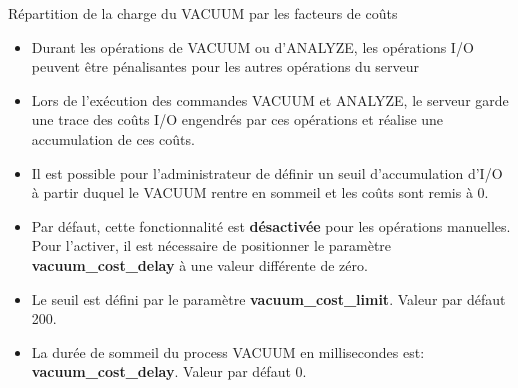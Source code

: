 
\begin{frame}{Répartition de la charge du VACUUM par les facteurs de coûts}

\begin{itemize}
   \item Durant les opérations de VACUUM ou d'ANALYZE, les opérations I/O peuvent être pénalisantes pour les autres opérations du serveur
   \item Lors de l'exécution des commandes VACUUM et ANALYZE, le serveur garde une trace des coûts I/O engendrés par ces opérations et réalise une accumulation de ces coûts.
   \item Il est possible pour l'administrateur de définir un seuil d'accumulation d'I/O à partir duquel le VACUUM rentre en sommeil et les coûts sont remis à 0.
   \item Par défaut, cette fonctionnalité est \textbf{désactivée} pour les opérations manuelles. Pour l'activer, il est nécessaire de positionner le paramètre \textbf{vacuum\_cost\_delay} à une valeur différente de zéro.
   \item Le seuil est défini par le paramètre \textbf{vacuum\_cost\_limit}. Valeur par défaut 200.
   \item La durée de sommeil du process VACUUM en millisecondes est: \textbf{vacuum\_cost\_delay}. Valeur par défaut 0.

\end{itemize}

\begin{tiny}
\begin{toile}
\end{toile}
\end{tiny}

\end{frame}



